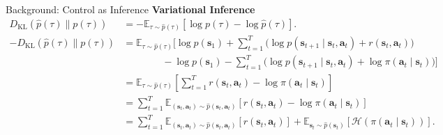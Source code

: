\begin{frame}{Background: Control as Inference}
\textbf{Variational Inference}
\begin{align*}
D_{\mathrm{KL}}(\hat{p}(\tau) \| p(\tau)) &= -\mathbb{E}_{\tau \sim \hat{p}(\tau)}[\log p(\tau) - \log \hat{p}(\tau)]. \\
-D_{\mathrm{KL}}(\hat{p}(\tau) \| p(\tau)) &= \mathbb{E}_{\tau \sim \hat{p}(\tau)}\Bigg[ \log p(\mathbf{s}_1) + \sum_{t=1}^{T} \Big( \log p(\mathbf{s}_{t+1} \mid \mathbf{s}_t, \mathbf{a}_t) + r(\mathbf{s}_t, \mathbf{a}_t) \Big) \\
&\qquad\qquad - \log p(\mathbf{s}_1) - \sum_{t=1}^{T} \Big( \log p(\mathbf{s}_{t+1} \mid \mathbf{s}_t, \mathbf{a}_t) + \log \pi(\mathbf{a}_t \mid \mathbf{s}_t) \Big) \Bigg] \\
&= \mathbb{E}_{\tau \sim \hat{p}(\tau)}\!\left[ \sum_{t=1}^{T} r(\mathbf{s}_t, \mathbf{a}_t) - \log \pi(\mathbf{a}_t \mid \mathbf{s}_t) \right] \\
&= \sum_{t=1}^{T} \mathbb{E}_{(\mathbf{s}_t, \mathbf{a}_t) \sim \hat{p}(\mathbf{s}_t, \mathbf{a}_t)}\!\left[ r(\mathbf{s}_t, \mathbf{a}_t) - \log \pi(\mathbf{a}_t \mid \mathbf{s}_t) \right] \\
&= \sum_{t=1}^{T} \mathbb{E}_{(\mathbf{s}_t, \mathbf{a}_t) \sim \hat{p}(\mathbf{s}_t, \mathbf{a}_t)}[r(\mathbf{s}_t, \mathbf{a}_t)] + \mathbb{E}_{\mathbf{s}_t \sim \hat{p}(\mathbf{s}_t)}[\mathcal{H}(\pi(\mathbf{a}_t \mid \mathbf{s}_t))].
\end{align*}
\end{frame}
